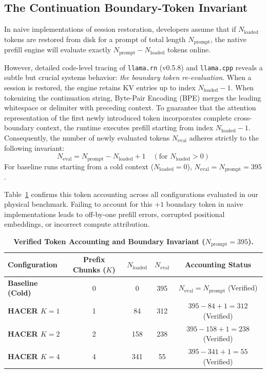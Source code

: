 \subsection{The Continuation Boundary-Token Invariant}
In naive implementations of session restoration, developers assume that if $N_{\text{loaded}}$ tokens are restored from disk for a prompt of total length $N_{\text{prompt}}$, the native prefill engine will evaluate exactly $N_{\text{prompt}} - N_{\text{loaded}}$ tokens online.

However, detailed code-level tracing of \texttt{llama.rn} (v0.5.8) and \texttt{llama.cpp} reveals a subtle but crucial systems behavior: \emph{the boundary token re-evaluation}. When a session is restored, the engine retains KV entries up to index $N_{\text{loaded}} - 1$. When tokenizing the continuation string, Byte-Pair Encoding (BPE) merges the leading whitespace or delimiter with preceding context. To guarantee that the attention representation of the first newly introduced token incorporates complete cross-boundary context, the runtime executes prefill starting from index $N_{\text{loaded}} - 1$. Consequently, the number of newly evaluated tokens $N_{\text{eval}}$ adheres strictly to the following invariant:
\begin{equation}
    N_{\text{eval}} = N_{\text{prompt}} - N_{\text{loaded}} + 1 \quad (\text{for } N_{\text{loaded}} > 0)
    \label{eq:boundary_token}
\end{equation}
For baseline runs starting from a cold context ($N_{\text{loaded}} = 0$), $N_{\text{eval}} = N_{\text{prompt}} = 395$.

Table~\ref{tab:token_accounting} confirms this token accounting across all configurations evaluated in our physical benchmark. Failing to account for this $+1$ boundary token in naive implementations leads to off-by-one prefill errors, corrupted positional embeddings, or incorrect compute attribution.

\begin{table}[h]
\centering
\caption{\textbf{Verified Token Accounting and Boundary Invariant ($N_{\text{prompt}} = 395$).}}
\label{tab:token_accounting}
\small
\begin{tabular}{lcccc}
\toprule
\textbf{Configuration} & \textbf{Prefix Chunks ($K$)} & $N_{\text{loaded}}$ & $N_{\text{eval}}$ & \textbf{Accounting Status} \\
\midrule
\textbf{Baseline (Cold)} & 0 & 0 & 395 & $N_{\text{eval}} = N_{\text{prompt}}$ (Verified) \\
\textbf{HACER $K=1$} & 1 & 84 & 312 & $395 - 84 + 1 = 312$ (Verified) \\
\textbf{HACER $K=2$} & 2 & 158 & 238 & $395 - 158 + 1 = 238$ (Verified) \\
\textbf{HACER $K=4$} & 4 & 341 & 55 & $395 - 341 + 1 = 55$ (Verified) \\
\bottomrule
\end{tabular}
\end{table}

